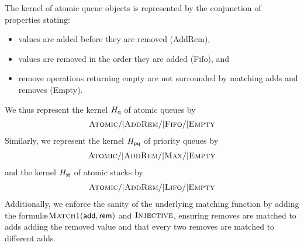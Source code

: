 \begin{example}

  The kernel of atomic queue objects is represented by the conjunction of properties stating:
  \begin{itemize}


    \item values are added before they are removed ({\sc AddRem}),

    \item values are removed in the order they are added ({\sc Fifo}), and

    \item remove operations returning empty are not surrounded by matching adds
    and removes ({\sc Empty}).

  \end{itemize}
  We thus represent the kernel $H_{\sf q}$ of atomic queues by
  \begin{align*}
    \textsc{Atomic}  /| \textsc{AddRem}
      /| \textsc{Fifo} /| \textsc{Empty}
  \end{align*}
  Similarly, we represent the kernel $H_{\sf pq}$ of priority queues by
  \begin{align*}
    \textsc{Atomic} /| \textsc{AddRem}
      /| \textsc{Max} /| \textsc{Empty}
  \end{align*}
  and the kernel $H_{\sf st}$ of atomic stacks by
  \begin{align*}
    \textsc{Atomic} /| \textsc{AddRem}
      /| \textsc{Lifo} /| \textsc{Empty}
  \end{align*}
  Additionally, we enforce the sanity of the underlying matching function by
  adding the formul\ae $\textsc{Match1}({\sf add},{\sf
  rem})$ and $\textsc{Injective}$, ensuring removes are matched to adds adding 
  the removed value and that every two removes are matched to different adds.

\end{example}

